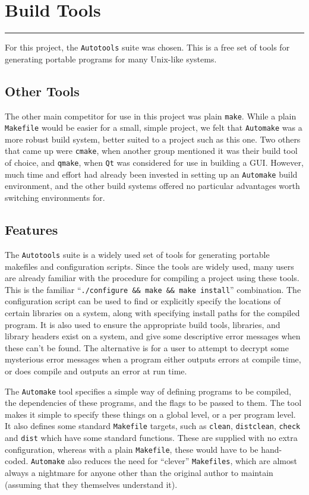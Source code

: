 \section{Build Tools}
\vspace{-2em}\rule{\textwidth}{1pt}\vspace{1em}

For this project, the \texttt{Autotools} suite was chosen.
This is a free set of tools for generating portable programs for many
Unix-like systems.

\subsection{Other Tools}
The other main competitor for use in this project was plain \texttt{make}.
While a plain \texttt{Makefile} would be easier for a small, simple project,
we felt that \texttt{Automake} was a more robust build system, better suited
to a project such as this one.
Two others that came up were \texttt{cmake}, when another group mentioned it
was their build tool of choice, and \texttt{qmake}, when \texttt{Qt} was
considered for use in building a GUI.
However, much time and effort had already been invested in setting up
an \texttt{Automake} build environment, and the other build systems offered
no particular advantages worth switching environments for.

\subsection{Features}
The \texttt{Autotools} suite is a widely used set of tools for generating
portable makefiles and configuration scripts.
Since the tools are widely used, many users are already familiar with
the procedure for compiling a project using these tools.
This is the familiar ``\texttt{./configure \&\& make \&\& make install}''
combination.
The configuration script can be used to find or explicitly specify the
locations of certain libraries on a system, along with specifying install
paths for the compiled program.
It is also used to ensure the appropriate build tools, libraries, and
library headers exist on a system, and give some descriptive error
messages when these can't be found.
The alternative is for a user to attempt to decrypt some mysterious
error messages when a program either outputs errors at compile time, or does
compile and outputs an error at run time.

The \texttt{Automake} tool specifies a simple way of defining programs to be
compiled, the dependencies of these programs, and the flags to be passed
to them.
The tool makes it simple to specify these things on a global level, or a
per program level.
It also defines some standard \texttt{Makefile} targets, such as
\texttt{clean}, \texttt{distclean}, \texttt{check} and \texttt{dist}
which have some standard functions.
These are supplied with no extra configuration, whereas with a plain
\texttt{Makefile}, these would have to be hand-coded.
\texttt{Automake} also reduces the need for ``clever'' \texttt{Makefiles},
which are almost always a nightmare for anyone other than the original
author to maintain (assuming that they themselves understand it).

